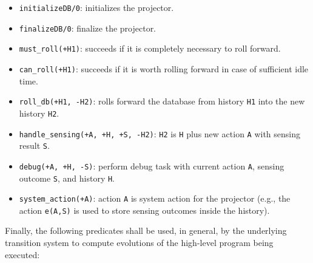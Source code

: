 \documentclass[11pt]{article}
\begin{document}
\begin{itemize}
\item \texttt{initializeDB/0}: initializes the projector.

\item \texttt{finalizeDB/0}: finalize the projector.

\item \texttt{must\_roll(+H1)}: succeeds if it is completely necessary to
roll forward.

\item \texttt{can\_roll(+H1)}: succeeds if it is worth rolling forward in case
of sufficient idle time.

\item \texttt{roll\_db(+H1, -H2)}: rolls forward the database from history
\texttt{H1} into the new history \texttt{H2}.
  

\item \texttt{handle\_sensing(+A, +H, +S, -H2)}:
  \texttt{H2} is \texttt{H} plus new action \texttt{A} with sensing result
\texttt{S}.

\item \texttt{debug(+A, +H, -S)}:
  perform debug task with current action \texttt{A}, sensing outcome
\texttt{S}, and history \texttt{H}.

\item \texttt{system\_action(+A)}:
  action \texttt{A} is system action for the projector  (e.g., the action
  \texttt{e(A,S)} is used to store sensing outcomes inside the history).
\end{itemize}

Finally, the following predicates shall be used, in general, by the underlying
transition system to compute evolutions of the high-level program being
executed:
\end{document}
